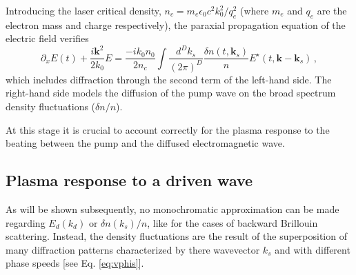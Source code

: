 \documentclass[
 reprint,
 amsmath,amssymb,
 aps,
]{revtex4-1}
\begin{document}
Introducing the laser critical density, $n_c = m_e \epsilon_0c^2 k_0^2/q_e^2 $ (where  $m_e$ and  $q_e$ are the  electron mass and charge respectively), the  paraxial propagation equation of the electric field verifies 
\begin{equation}
    \partial_x E(t) +\frac{i\mathbf{k}^2}{2k_0}E=\frac{-ik_0n_0}{2n_c} \int \frac{d^Dk_s}{(2\pi)^D} \frac{\delta n(t,\mathbf{k}_s)}{n} E^\star(t,\mathbf{k}-\mathbf{k}_s) \, ,\label{eq:parax}
\end{equation}
which includes diffraction through the second term of the left-hand side.  
The right-hand side models the  diffusion  of the pump wave  on the broad spectrum density fluctuations ($\delta n/n$).

At this stage it is crucial to  account correctly for the plasma response to the beating between  the pump and the diffused electromagnetic wave. 

\subsection{Plasma response to a driven wave}
As will be shown subsequently, no monochromatic approximation can be made regarding $E_d(k_d)$ or $\delta n(k_s)/n$, like for the cases of backward Brillouin scattering. Instead, the density fluctuations are the  result of the superposition of many diffraction patterns characterized by there wavevector $k_s$ and with different  phase speeds [see Eq. \eqref{eq:vphis}].
\end{document}
